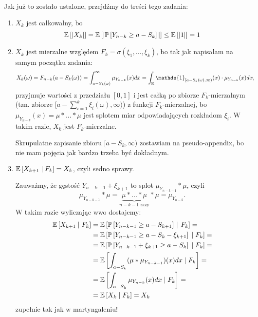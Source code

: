 \documentclass{article}
\begin{document}
Jak już to zostało ustalone, przejdźmy do treści tego zadania:
\begin{enumerate}
  \item $X_k$ jest całkowalny, bo
    \begin{align*}
      \expected{|X_k|}=\expected{|\prob{Y_{n-k}\geq a-S_k}|}\leq \expected{|1|}=1
    \end{align*}
  \item $X_k$ jest mierzalne względem $F_k=\sigma(\xi_1,...,\xi_k)$, bo tak jak napisałam na samym początku zadania:
    \begin{align*}
      X_k(\omega)=F_{n-k}(a-S_k(\omega))&=\int_{a-S_k(\omega)}^\infty \mu_{Y_{n-k}}(x)dx=\int_{\R}\mathds{1}_{[a-S_k(\omega), \infty)}(x)\cdot\mu_{Y_{n-k}}(x)dx,
    \end{align*}
    przyjmuje wartości z przedziału $[0,1]$ i jest całką po zbiorze $F_k$-mierzalnym (tzn. zbiorze $[a-\sum_{i=1}^k\xi_i(\omega), \infty)$) z funkcji $F_k$-mierzalnej, bo $\mu_{Y_{n-k}}(x)=\mu\ast...\ast\mu$ jest splotem miar odpowiadających rozkładom $\xi_i$. W takim razie, $X_k$ jest $F_k$-mierzalne. 

    Skrupulatne zapisanie zbioru $[a-S_k, \infty)$ zostawiam na pseudo-appendix, bo nie mam pojęcia jak bardzo trzeba być dokładnym.

  \item $\expected{X_{k+1}}{F_k}=X_k$, czyli sedno sprawy.

    Zauważmy, że gęstość $Y_{n-k-1}+\xi_{k+1}$ to splot $\mu_{Y_{n-k-1}}\ast \mu$, czyli 
    $$\mu_{Y_{n-k-1}}\ast\mu=\underbrace{\mu\ast...\ast \mu}_{n-k-1\text{ razy}}\ast\mu=\mu_{Y_{n-k}}.$$
    W takim razie wyliczając wwo dostajemy:
    \begin{align*}
      \expected{X_{k+1}}{F_k}&=\expected{\prob{Y_{n-k-1}\geq a-S_{k+1}}}{F_k}=\\
                             &=\expected{\prob{Y_{n-k-1}\geq a-S_k-\xi_{k+1}}}{F_k}=\\ 
                             &=\expected{\prob{Y_{n-k-1}+\xi_{k+1}\geq a-S_k}}{F_k}=\\ 
                             &=\expected{\int_{a-S_k}(\mu\ast \mu_{Y_{n-k-1}})(x)dx}{F_k}=\\ 
                             &=\expected{\int_{a-S_k}\mu_{Y_{n-k}}(x)dx}{F_k}=\\ 
                             &=\expected{X_k}{F_k}=X_k
    \end{align*}
    zupełnie tak jak w martyngaleniu!
\end{enumerate}
\end{document}
